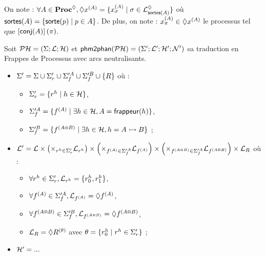 \newcommand{\phmtophan}{\mathsf{phm2phan}}
\newcommand{\srsymbol}{r}
\newcommand{\sr}[1]{\srsymbol^{#1}}
\newcommand{\srgsymbol}{R}
\newcommand{\srg}{\srgsymbol}
\newcommand{\scfsymbol}{f}
\newcommand{\scf}[1]{\scfsymbol^{(#1)}}
\newcommand{\scfa}{\scf{A}}
\newcommand{\scfb}{\scf{A \Cap B}}

\newcommand{\PHssr}[1][\PHs']{#1_{\srsymbol}}
\newcommand{\PHsscfa}[1][\PHs']{#1^A_{\scfsymbol}}
\newcommand{\PHsscfb}[1][\PHs']{#1^B_{\scfsymbol}}

\begin{definition}
  On note : $\forall A \in \mathbf{Proc}^{\lozenge}, \lozenge x^{(A)} =
  \{ x^{(A)}_\sigma \mid \sigma \in \mathcal{L}^\lozenge_{\mathsf{sortes}(A)} \}$
  où $\mathsf{sortes}(A) = \{ \mathsf{sorte}(p) \mid p \in A \}$.
  De plus, on note : $x^{(A)}_\pi \in \lozenge x^{(A)}$
  le processus tel que $\left[\mathsf{conj}(A)\right](\pi)$.

  Soit $\mathcal{PH} = (\Sigma; \mathcal{L}; \mathcal{H})$ et $\phmtophan(\PH) = (\PHs'; \PHl'; \PHh'; \PHn')$
  sa traduction en Frappes de Processus avec arcs neutralisants.
  \begin{itemize}
    \item $\PHs' = \PHs \cup \PHs'_{\srsymbol} \cup \PHs'^A_{\scfsymbol} \cup
      \PHs'^B_{\scfsymbol} \cup \{ \srg \}$ où :
      \begin{itemize}
        \item $\PHssr = \{ \sr{h} \mid h \in \PHh \}$,
        \item $\PHsscfa = \{ \scf{A} \mid \exists h \in \PHh, A = \hitter{h} \}$,
        \item $\PHsscfb = \{ \scf{A \Cap B} \mid
          \exists h \in \PHh, h = \PHfrappemult{A}{B} \}$ ;
      \end{itemize}
    \item $\PHl' = \PHl \times
      \left( \bigtimes{\sr{h} \in \PHssr} \PHl_{\sr{h}} \right) \times
      \left( \bigtimes{\scfa \in \PHsscfa} \PHl_{\scfa} \right) \times
      \left( \bigtimes{\scfb \in \PHsscfa} \PHl_{\scfb} \right) \times
      \PHl_\srg$ où :
      \begin{itemize}
        \item $\forall \sr{h} \in \PHssr, \PHl_{\sr{h}} = \{ \sr{h}_0, \sr{h}_1 \}$,
        \item $\forall \scfa \in \PHsscfa, \PHl_{\scfa} = \makesc{\scfa}$,
        \item $\forall \scfb \in \PHsscfb, \PHl_{\scfb} = \makesc{\scfb}$,
        \item $\PHl_\srg = \makesc{\srg^{(\theta)}}$
          avec $\theta = \{ \sr{h}_0 \mid \sr{h} \in \PHssr \}$ ;
      \end{itemize}
    \item $\mathcal{H}' = ...$
  \end{itemize}
\end{definition}





